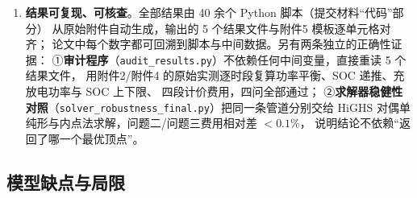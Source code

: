 \begin{enumerate}[label=(\arabic*), leftmargin=2.2em, itemsep=2pt]
从机制上排除了“用未来数据事后调整计划\nobreak”的虚优（\cref{tab:q2exec} 给出同一计划三种执行方式的对照\nobreak）\nobreak。
\item \textbf{结果可复现\nobreak、可核查}\nobreak。全部结果由 40 余个 Python 脚本（提交材料“代码\nobreak”部分\nobreak）
从原始附件自动生成\nobreak，输出的 5 个结果文件与附件5 模板逐单元格对齐\nobreak；
论文中每个数字都可回溯到脚本与中间数据\nobreak。另有两条独立的正确性证据\nobreak：
①\textbf{审计程序}（\texttt{audit\_results.py}\nobreak）不依赖任何中间变量\nobreak，直接重读 5 个结果文件\nobreak，
用附件2/附件4 的原始实测逐时段复算功率平衡\nobreak、SOC 递推\nobreak、充放电功率与 SOC 上下限\nobreak、
四段计价费用\nobreak，四问全部通过\nobreak；
②\textbf{求解器稳健性对照}（\texttt{solver\_robustness\_final.py}\nobreak）把同一条管道分别交给
HiGHS 对偶单纯形与内点法求解\nobreak，问题二/问题三费用相对差 $<0.1\%$\nobreak，
说明结论不依赖“返回了哪一个最优顶点\nobreak”\nobreak。
\end{enumerate}

\subsection{模型缺点与局限}

